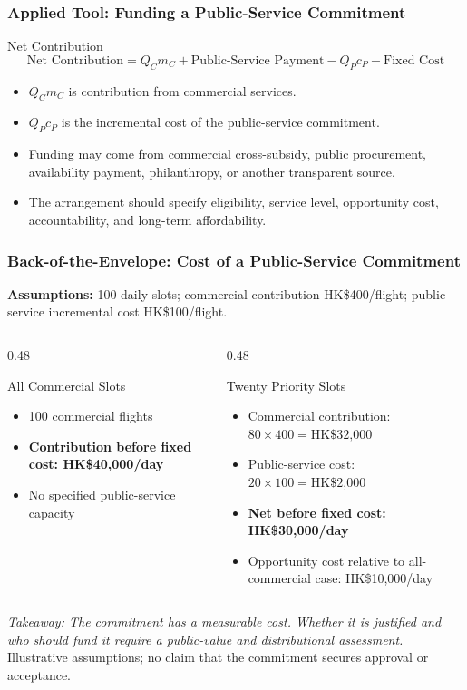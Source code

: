 \documentclass{beamer}
\begin{document}
\begin{frame}[t]
\frametitle{Applied Tool: Funding a Public-Service Commitment}
\begin{block}{Net Contribution}
\[
\text{Net Contribution}
=Q_C m_C+\text{Public-Service Payment}
-Q_P c_P-\text{Fixed Cost}
\]
\end{block}
\begin{itemize}
\item $Q_Cm_C$ is contribution from commercial services.
\item $Q_Pc_P$ is the incremental cost of the public-service commitment.
\item Funding may come from commercial cross-subsidy, public procurement, availability payment, philanthropy, or another transparent source.
\item The arrangement should specify eligibility, service level, opportunity cost, accountability, and long-term affordability.
\end{itemize}
\end{frame}

\begin{frame}[t,shrink=11]
\frametitle{Back-of-the-Envelope: Cost of a Public-Service Commitment}
\textbf{Assumptions:} 100 daily slots; commercial contribution HK\$400/flight; public-service incremental cost HK\$100/flight.
\begin{columns}[T]
\begin{column}{0.48\textwidth}\begin{block}{All Commercial Slots}
\begin{itemize}
\item 100 commercial flights
\item \textbf{Contribution before fixed cost: HK\$40,000/day}
\item No specified public-service capacity
\end{itemize}\end{block}\end{column}
\begin{column}{0.48\textwidth}\begin{block}{Twenty Priority Slots}
\begin{itemize}
\item Commercial contribution: $80\times400=\text{HK\$32,000}$
\item Public-service cost: $20\times100=\text{HK\$2,000}$
\item \textbf{Net before fixed cost: HK\$30,000/day}
\item Opportunity cost relative to all-commercial case: HK\$10,000/day
\end{itemize}\end{block}\end{column}
\end{columns}
\textit{Takeaway: The commitment has a measurable cost. Whether it is justified and who should fund it require a public-value and distributional assessment.}
\vfill{\tiny Illustrative assumptions; no claim that the commitment secures approval or acceptance.}
\end{frame}
\end{document}

